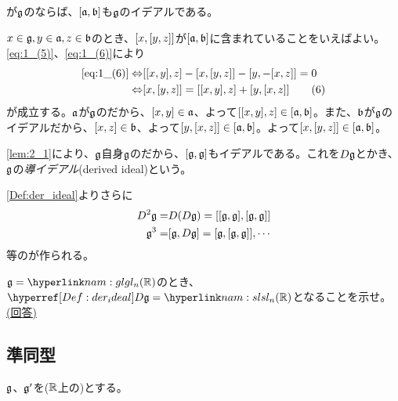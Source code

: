 \documentclass[fleqn,twocolumn,titlepage,dvipdfmx]{jsarticle}
\begin{document}
\begin{lemma}\label{lem:2_1}
  が$\mathfrak{g}$の{}ならば、$\comm{\a}{\b}$も$\mathfrak{g}$のイデアルである。
\end{lemma}

\begin{Proof}
  $x\in\mathfrak{g},y\in\mathfrak{a},z\in\mathfrak{b}$のとき、$\comm{x}{\comm{y}{z}}$が$\comm{\a}{\b}$に含まれていることをいえばよい。\eqref{eq:1_(5)}、\eqref{eq:1_(6)}により
  \begin{align*}
    \mathrm{\eqref{eq:1_(6)}} 
    \Leftrightarrow
    & \comm{\comm{x}{y}}{z}-\comm{x}{\comm{y}{z}}-\comm{y}{-\comm{x}{z}}=0\\
    \Leftrightarrow
    & \comm{x}{\comm{y}{z}}=\comm{\comm{x}{y}}{z}+\comm{y}{\comm{x}{z}} \tag{6}\label{eq:2_(6)}
  \end{align*}
  が成立する。$\mathfrak{a}$が$\mathfrak{g}$の{}だから、$\comm{x}{y}\in\a$、よって$\comm{\comm{x}{y}}{z}\in\comm{\a}{\b}$。また、$\mathfrak{b}$が$\mathfrak{g}$のイデアルだから、$\comm{x}{z}\in\b$、よって$\comm{y}{\comm{x}{z}}\in\comm{\a}{\b}$。よって$\comm{x}{\comm{y}{z}}\in\comm{\a}{\b}$。
\end{Proof}

\begin{definition}[導イデアル]\label{Def:der_ideal}
  \cref{lem:2_1}により、$\mathfrak{g}$自身$\mathfrak{g}$の{}だから、$\comm{\g}{\g}$もイデアルである。これを$D\mathfrak{g}$とかき、$\mathfrak{g}$の\emph{導イデアル}(derived ideal)という。
\end{definition}
\begin{remark}
  \cref{Def:der_ideal}よりさらに
  \begin{align*}
    D^{2}\g =& D(D\g) = \comm{\comm{\g}{\g}}{\comm{\g}{\g}}\\
    \g^{3} =& \comm{\g}{D\g} = \comm{\g}{\comm{\g}{\g}},\cdots
  \end{align*}
  等の{}が作られる。
\end{remark}

\begin{problem}\label{prob:1}
  $\g=\hlin{nam:gl}{\gl_n(\R)}$のとき、$\href{Def:der_ideal}{D\g}=\hlin{nam:sl}{\sl_n(\R)}$となることを示せ。
  \href{sol:1}{(回答)}
\end{problem}

\subsection{準同型}
$\mathfrak{g}$、$\mathfrak{g}^\prime$を($\mathbb{R}$上の){}とする。
\end{document}

